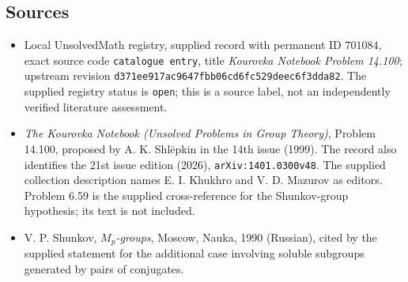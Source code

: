 \documentclass[11pt]{article}
\begin{document}
\subsection{Sources}
\begin{itemize}
\item Local UnsolvedMath registry, supplied record with permanent ID \(701084\), exact source code \texttt{catalogue entry}, title \emph{Kourovka Notebook Problem 14.100}; upstream revision \texttt{d371ee917ac9647fbb06cd6fc529deec6f3dda82}. The supplied registry status is \texttt{open}; this is a source label, not an independently verified literature assessment.
\item \emph{The Kourovka Notebook (Unsolved Problems in Group Theory)}, Problem 14.100, proposed by A. K. Shl\"epkin in the 14th issue (1999). The record also identifies the 21st issue edition (2026), \texttt{arXiv:1401.0300v48}. The supplied collection description names E. I. Khukhro and V. D. Mazurov as editors. Problem 6.59 is the supplied cross-reference for the Shunkov-group hypothesis; its text is not included.
\item V. P. Shunkov, \emph{\(M_p\)-groups}, Moscow, Nauka, 1990 (Russian), cited by the supplied statement for the additional case involving soluble subgroups generated by pairs of conjugates.
\end{itemize}
\end{document}
